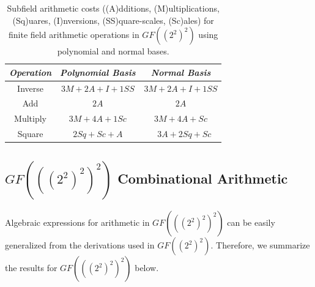 \begin{table}[ht!]
\begin{center}
\caption{Subfield arithmetic costs ((A)dditions, (M)ultiplications, (Sq)uares, (I)nversions, (SS)quare-scales, (Sc)ales) for finite field arithmetic operations in $GF((2^2)^2)$ using polynomial and normal bases.}
\label{tab:gf24-ops-complexity}
	\begin{tabular}{| c | c | c |} \hline
	\emph{Operation} & \emph{Polynomial Basis} & \emph{Normal Basis} \\ \hline
	Inverse & $3M + 2A + I + 1SS$ & $3M + 2A + I + 1SS$ \\
	Add & $2A$ & $2A$ \\
	Multiply & $3M + 4A + 1Sc$ & $3M + 4A + Sc$ \\
	Square & $2Sq + Sc + A$ & ~ $3A + 2Sq + Sc$ \\ \hline
	\end{tabular}
\end{center}
\end{table}

\newpage
\subsection{$GF(((2^2)^2)^2)$ Combinational Arithmetic} \label{sec:gf28arith}
Algebraic expressions for arithmetic in $GF(((2^2)^2)^2)$ can be easily generalized from the derivations used in $GF((2^2)^2)$. Therefore, we summarize the results for $GF(((2^2)^2)^2)$ below.

